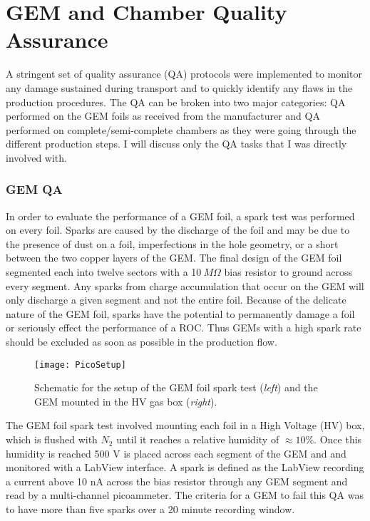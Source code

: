\section{GEM and Chamber Quality Assurance}

A stringent set of quality assurance (QA)\cite{Brucken:2018rej}\cite{Brucken:2017qjy} protocols were implemented to monitor any damage sustained during transport and to quickly identify any flaws in the production procedures.  The QA can be broken into two major categories: QA performed on the GEM foils as received from the manufacturer and QA performed on complete/semi-complete chambers as they were going through the different production steps.  I will discuss only the QA tasks that I was directly involved with.

\subsubsection{GEM QA}

In order to evaluate the performance of a GEM foil, a spark test was performed on every foil.  Sparks are caused by the discharge of the foil and may be due to the presence of dust on a foil, imperfections in the hole geometry, or a short between the two copper layers of the GEM.  The final design of the GEM foil segmented each into twelve sectors with a 10$\: M \Omega$ bias resistor to ground across every segment.  Any sparks from charge accumulation that occur on the GEM will only discharge a given segment and not the entire foil.  Because of the delicate nature of the GEM foil, sparks have the potential to permanently damage a foil or seriously effect the performance of a ROC.  Thus GEMs with a high spark rate should be excluded as soon as possible in the production flow.

\begin{figure}[h]
\texttt{[image: PicoSetup]}
\centering
\caption{Schematic for the setup of the GEM foil spark test (\textit{left})\cite{Brucken:2018rej} and the GEM mounted in the HV gas box (\textit{right}). }
\label{fig:PicoSetup}
\end{figure}

\noindent
The GEM foil spark test involved mounting each foil in a High Voltage (HV) box, which is flushed with $N_{2}$ until it reaches a relative humidity of $\approx 10\%$.  Once this humidity is reached 500 V is placed across each segment of the GEM and and monitored with a LabView interface.  A spark is defined as the LabView recording a current above 10 nA across the bias resistor through any GEM segment and read by a multi-channel picoammeter.  The criteria for a GEM to fail this QA was to have more than five sparks over a 20 minute recording window.

